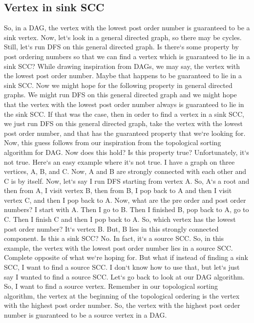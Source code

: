 \subsection{Vertex in sink SCC}
So, in a DAG, the vertex with the lowest post order number is guaranteed to be a sink vertex.
Now, let`s look in a general directed graph, so there may be cycles.
Still, let`s run DFS on this general directed graph.
Is there`s some property by post ordering numbers so that we can find a vertex which is guaranteed to lie in a sink SCC? While drawing inspiration from DAGs, we may say, the vertex with the lowest post order number.
Maybe that happens to be guaranteed to lie in a sink SCC\@.
Now we might hope for the following property in general directed graphs.
We might run DFS on this general directed graph and we might hope that the vertex with the lowest post order number always is guaranteed to lie in the sink SCC\@.
If that was the case, then in order to find a vertex in a sink SCC, we just run DFS on this general directed graph, take the vertex with the lowest post order number, and that has the guaranteed property that we`re looking for.
Now, this guess follows from our inspiration from the topological sorting algorithm for DAG\@.
Now does this hold? Is this property true? Unfortunately, it`s not true.
Here`s an easy example where it`s not true.
I have a graph on three vertices, A, B, and C\@.
Now, A and B are strongly connected with each other and C is by itself.
Now, let`s say I run DFS starting from vertex A\@.
So, A`s a root and then from A, I visit vertex B, then from B, I pop back to A and then I visit vertex C, and then I pop back to A\@.
Now, what are the pre order and post order numbers? I start with A\@.
Then I go to B\@.
Then I finished B, pop back to A, go to C\@.
Then I finish C and then I pop back to A\@.
So, which vertex has the lowest post order number? It`s vertex B\@.
But, B lies in this strongly connected component.
Is this a sink SCC? No.
In fact, it`s a source SCC\@.
So, in this example, the vertex with the lowest post order number lies in a source SCC\@.
Complete opposite of what we`re hoping for.
But what if instead of finding a sink SCC, I want to find a source SCC\@.
I don`t know how to use that, but let`s just say I wanted to find a source SCC\@.
Let`s go back to look at our DAG algorithm.
So, I want to find a source vertex.
Remember in our topological sorting algorithm, the vertex at the beginning of the topological ordering is the vertex with the highest post order number.
So, the vertex with the highest post order number is guaranteed to be a source vertex in a DAG\@.
